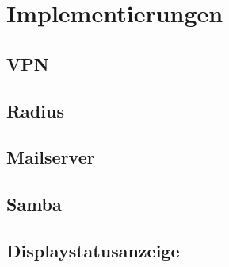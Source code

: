\chapter{Implementierungen}

\section{VPN}

\section{Radius}

\section{Mailserver}

\section{Samba}

\section{Displaystatusanzeige}
